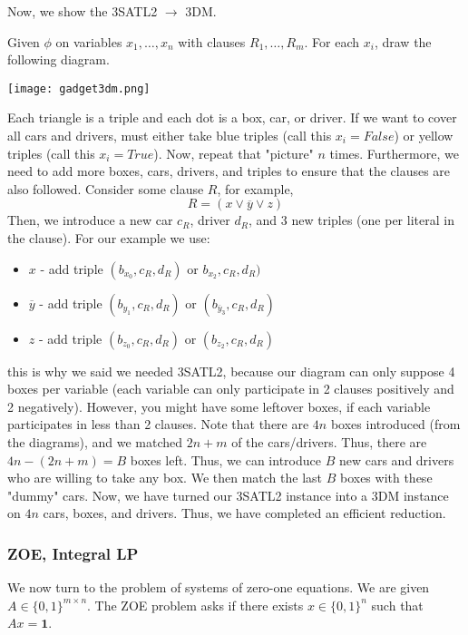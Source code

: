 Now, we show the 3SATL2 $\to$ 3DM.
\begin{algothm}
    Given $\phi$ on variables $x_1, \dots, x_n$ with clauses $R_1, \dots, R_m$. For each $x_i$, draw the following diagram.

    \texttt{[image: gadget3dm.png]}

    Each triangle is a triple and each dot is a box, car, or driver. If we want to cover all cars and drivers, must either take blue triples (call this $x_i = False$)
    or yellow triples (call this $x_i = True$). Now, repeat that "picture" $n$ times. Furthermore, we need to add more boxes, cars, drivers, and triples
    to ensure that the clauses are also followed. Consider some clause $R$, for example,
    \[ R = (x \lor \overline{y} \lor z) \]
    Then, we introduce a new car $c_R$, driver $d_R$, and 3 new triples (one per literal in the clause). For our example we use:
    \begin{itemize}
        \item $x$ - add triple $(b_{x_0}, c_R, d_R)$ or $b_{x_2}, c_R, d_R)$
        \item $\overline{y}$ - add triple $(b_{y_1}, c_R, d_R)$ or $(b_{\overline{y}_3}, c_R, d_R)$
        \item $z$ - add triple $(b_{z_0}, c_R, d_R)$ or $(b_{z_2}, c_R, d_R)$
    \end{itemize}
    this is why we said we needed 3SATL2, because our diagram can only suppose 4 boxes per variable (each variable can only participate in 2 clauses
    positively and 2 negatively). However, you might have some leftover boxes,
    if each variable participates in less than 2 clauses. Note that there are $4n$ boxes introduced (from the diagrams), and we matched $2n + m$ of the cars/drivers.
    Thus, there are $4n - (2n + m) = B$ boxes left.
    Thus, we can introduce $B$ new cars and drivers who are willing to take any box. We then match the last $B$ boxes with these "dummy" cars. Now, we have turned our
    3SATL2 instance into a 3DM instance on $4n$ cars, boxes, and drivers. Thus, we have completed an efficient reduction.
\end{algothm}

\subsubsection{ZOE, Integral LP}
We now turn to the problem of systems of zero-one equations. We are given $A \in \{0, 1\}^{m \times n}$. The ZOE problem asks if there exists
$x \in \{0, 1\}^n$ such that $Ax = \textbf{1}$.

